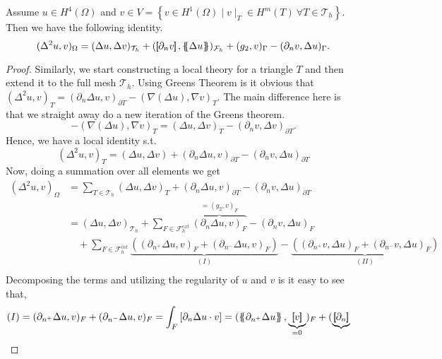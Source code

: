 \begin{lemma}
 Assume $u \in H^{4}( \Omega ) $ and $v \in  V = \left\{ v \in H^{1}( \Omega )  \mid  v \mid _{T} \in H^{m}( T) \ \forall T \in \mathcal{T} _{h}   \right\} $. Then we have the following identity.
\[
( \Delta ^2 u, v ) _{\Omega } = ( \Delta u, \Delta v)_{\mathcal{T} _{h} }  +  ( \jump{ \partial _{n} v} , \mean{ \Delta u })_{\mathcal{F}_{h} }  + ( g_{2} , v )_{\Gamma } - ( \partial _{n} v, \Delta u)_{\Gamma }.
\]

\end{lemma}
\begin{proof}
  Similarly, we start constructing a local theory for a triangle $T$ and then extend it to the full mesh $\mathcal{T}_{h} $. Using Greens Theorem is it obvious that \(
\left( \Delta ^2 u,v \right) _{T }   = ( \partial _{n} \Delta u, v ) _{\partial T  } - ( \nabla \left( \Delta  u \right) , \nabla v ) _{T }
\).
The main difference here is that we straight away do a new iteration of the Greens theorem.
\begin{equation*}
-( \nabla ( \Delta u ) , \nabla v ) _{T }  =   ( \Delta u, \Delta v ) _{T} - ( \partial _{n}v , \Delta v)_{\partial T}
.\end{equation*}
Hence, we have a local identity s.t. \[
( \Delta ^2 u, v ) _{T} = ( \Delta u, \Delta v) +  ( \partial _{n} \Delta u, v)_{\partial T} - ( \partial _{n} v, \Delta u) _{\partial T}
\]
Now, doing a summation over all elements we get \[
    \begin{split}
( \Delta ^2 u, v ) _{\Omega } & = \sum_{T \in \mathcal{T}_{h} }^{}  ( \Delta u, \Delta v)_{T}
+  ( \partial _{n} \Delta u, v)_{\partial T} - ( \partial _{n} v, \Delta u) _{\partial T} \\
 & =   ( \Delta u, \Delta v)_{\mathcal{T} _{h}} +  \sum_{F \in \mathcal{F}_{h}^{ext} }^{}
  \overbrace{( \partial _{n} \Delta u, v)_{ F}}^{=( g_{2},v)_{F} }  - ( \partial _{n} v, \Delta u) _{F} \\
  &   \quad + \sum_{F \in \mathcal{F}_{h}^{int} }^{} \underbrace{( ( \partial _{n^{+}} \Delta u, v)_{ F} + ( \partial _{n^{-}} \Delta u, v)_{ F} )}_{(I)}  - \underbrace{( ( \partial _{n^{+}} v, \Delta u) _{F} + ( \partial _{n^{-}} v, \Delta u) _{F}
  )}_{(II)}   \\
    \end{split}
\]
Decomposing the terms and utilizing the regularity of $u$ and $v$ is it easy to see that,    \[
\begin{split}
    (I) & = ( \partial _{n^{+}} \Delta u, v)_{ F} + ( \partial _{n^{-}} \Delta u, v)_{ F}  = \int_{F}^{} \left[ \partial _{n} \Delta u \cdot  v \right] =  (  \mean{ \partial _{n^{+}} \Delta u } , \underbrace{\jump{v  }}_{ = 0}      )_{ F} + (  \underbrace{\jump{ \partial _{n}
}}
\end{split}\]
\end{proof}
